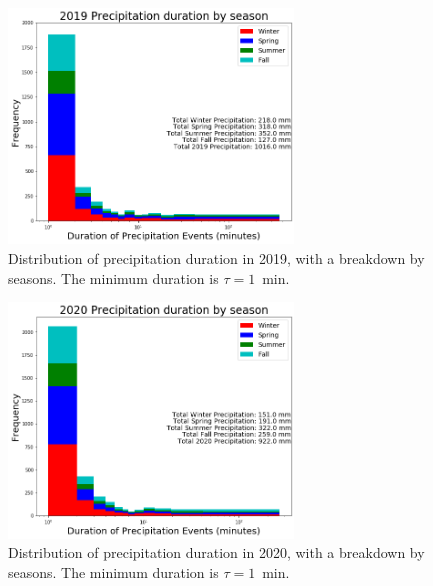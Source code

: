 \documentclass[11pt]{report}
\begin{document}
\clearpage
\begin{figure}[t]
 \centering
 \includegraphics[width=0.675\textwidth]{Figures/precip_2019.png}
 \caption[Precipitation histogram for 2019 broken down by season]
         {\label{p2019}Distribution of precipitation duration in 2019, with
           a breakdown by seasons. The minimum duration is $\tau = 1$~min.
         }
\end{figure}

\begin{figure}[b]
  \centering
  \includegraphics[width=0.675\textwidth]{Figures/precip_2020.png}
  \caption[Precipitation histogram for 2020 broken down by
    season]{\label{p2020} Distribution of precipitation duration in
    2020, with a breakdown by seasons. The minimum duration is $\tau =
    1$~min. %
  }
\end{figure}
\end{document}
